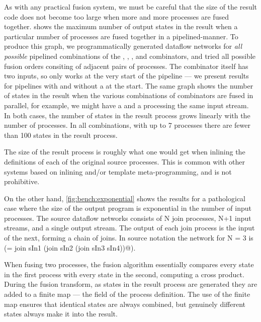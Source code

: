 As with any practical fusion system, we must be careful that the size of the result code does not become too large when more and more processes are fused together.
 shows the maximum number of output states in the result when a particular number of processes are fused together in a pipelined-manner.
To produce this graph, we programmatically generated dataflow networks for \emph{all possible} pipelined combinations of the \Hs@map@, \Hs@filter@, \Hs@scan@, \Hs@group@ and \Hs@join@ combinators, and tried all possible fusion orders consiting of adjacent pairs of processes.
The \Hs@join@ combinator itself has two inputs, so only works at the very start of the pipeline --- we present results for pipelines with and without a \Hs@join@ at the start.
The same graph shows the number of states in the result when the various combinations of combinators are fused in parallel, for example, we might have a \Hs@map@ and a \Hs@filter@ processing the same input stream.
In both cases, the number of states in the result process grows linearly with the number of processes. In all combinations, with up to 7 processes there are fewer than 100 states in the result process. 




The size of the result process is roughly what one would get when inlining the definitions of each of the original source processes. This is common with other systems based on inlining and/or template meta-programming, and is not prohibitive.

On the other hand, \cref{fig:bench:exponential} shows the results for a pathological case where the size of the output program is exponential in the number of input processes. The source dataflow networks consists of N join processes, N+1 input streams, and a single output stream. The output of each join process is the input of the next, forming a chain of joins. In source notation the network for N = 3 is (\Hs@sOut = join sIn1 (join sIn2 (join sIn3 sIn4))@).

When fusing two processes, the fusion algorithm essentially compares every state in the first process with every state in the second, computing a cross product. During the fusion transform, as states in the result process are generated they are added to a finite map --- the \Hs@instrs@ field of the process definition. The use of the finite map ensures that identical states are always combined, but genuinely different states always make it into the result. 


